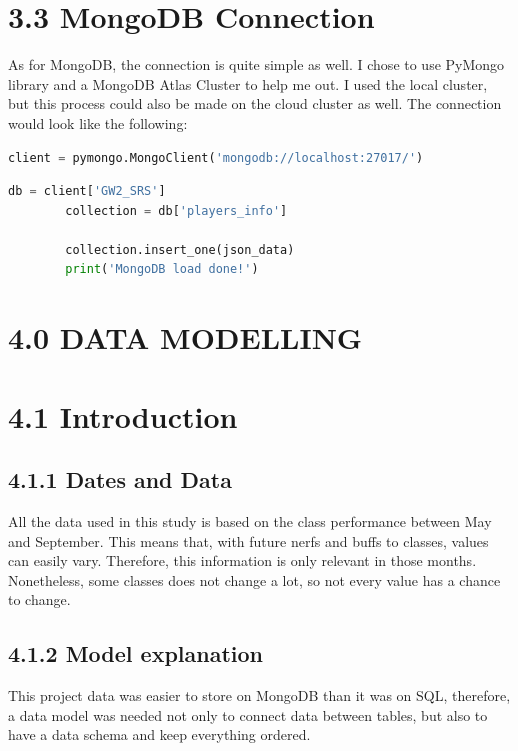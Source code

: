 \documentclass[12pt,a4paper]{article}
\begin{document}
    \newpage

    \section*{3.3 MongoDB Connection}
    As for MongoDB, the connection is quite simple as well. I chose to use PyMongo library and 
    a MongoDB Atlas Cluster to help me out. I used the local cluster, but this process could also
    be made on the cloud cluster as well. The connection would look like the following:

    \begin{lstlisting}[language=Python, caption=MongoDB Connection]
        client = pymongo.MongoClient('mongodb://localhost:27017/')
    \end{lstlisting}

    \begin{lstlisting}[language=Python, caption=MongoDB data load]
        db = client['GW2_SRS']
        collection = db['players_info']

        collection.insert_one(json_data)
        print('MongoDB load done!')
    \end{lstlisting}

    \newpage

    \section*{4.0 DATA MODELLING}

    \section*{\large 4.1 Introduction}
    \subsection*{\normalsize 4.1.1 Dates and Data}
    All the data used in this study is based on the class performance between May and September. This means
    that, with future nerfs and buffs to classes, values can easily vary. Therefore, this information is only
    relevant in those months. Nonetheless, some classes does not change a lot, so not every value has a chance
    to change.\\

    \subsection*{\normalsize 4.1.2 Model explanation}
    This project data was easier to store on MongoDB than it was on SQL, therefore, a data model was needed not
    only to connect data between tables, but also to have a data schema and keep everything ordered.
\end{document}
